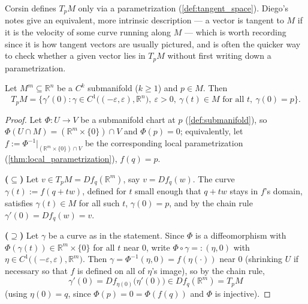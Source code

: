 \begin{ainote}
Corsin defines $T_pM$ only via a parametrization (\cref{def:tangent_space}). Diego's notes give
an equivalent, more intrinsic description --- a vector is tangent to $M$ if it is the velocity of
some curve running along $M$ --- which is worth recording since it is how tangent vectors are
usually pictured, and is often the quicker way to check whether a given vector lies in $T_pM$
without first writing down a parametrization.
\end{ainote}

\begin{proposition}
\label{prop:tangent_space_via_curves}
Let $M^m \subseteq \mathbb{R}^n$ be a $C^k$ submanifold ($k\geq1$) and $p \in M$. Then
\[T_pM = \big\{\gamma'(0) : \gamma \in C^1\big((-\varepsilon,\varepsilon), \mathbb{R}^n\big),\ \varepsilon>0,\ \gamma(t) \in M \text{ for all } t,\ \gamma(0)=p\big\}.\]
\end{proposition}

\begin{proof}
Let $\Phi : U \to V$ be a submanifold chart at $p$ (\cref{def:submanifold}), so
$\Phi(U\cap M) = (\mathbb{R}^m\times\{0\})\cap V$ and $\Phi(p)=0$; equivalently, let
$f := \Phi^{-1}|_{(\mathbb{R}^m\times\{0\})\cap V}$ be the corresponding local parametrization
(\cref{thm:local_parametrization}), $f(q)=p$.

\textbf{($\subseteq$)} Let $v \in T_pM = Df_q(\mathbb{R}^m)$, say $v = Df_q(w)$. The curve
$\gamma(t) := f(q+tw)$, defined for $t$ small enough that $q+tw$ stays in $f$'s domain, satisfies
$\gamma(t) \in M$ for all such $t$, $\gamma(0) = p$, and by the chain rule
$\gamma'(0) = Df_q(w) = v$.

\textbf{($\supseteq$)} Let $\gamma$ be a curve as in the statement. Since $\Phi$ is a
diffeomorphism with $\Phi(\gamma(t)) \in \mathbb{R}^m\times\{0\}$ for all $t$ near $0$, write
$\Phi\circ\gamma =: (\eta,0)$ with $\eta \in C^1\big((-\varepsilon,\varepsilon),\mathbb{R}^m\big)$.
Then $\gamma = \Phi^{-1}(\eta,0) = f(\eta(\cdot))$ near $0$ (shrinking $U$ if necessary so that
$f$ is defined on all of $\eta$'s image), so by the chain rule,
\[\gamma'(0) = Df_{\eta(0)}\big(\eta'(0)\big) \in Df_q(\mathbb{R}^m) = T_pM\]
(using $\eta(0)=q$, since $\Phi(p)=0=\Phi(f(q))$ and $\Phi$ is injective).
\end{proof}

